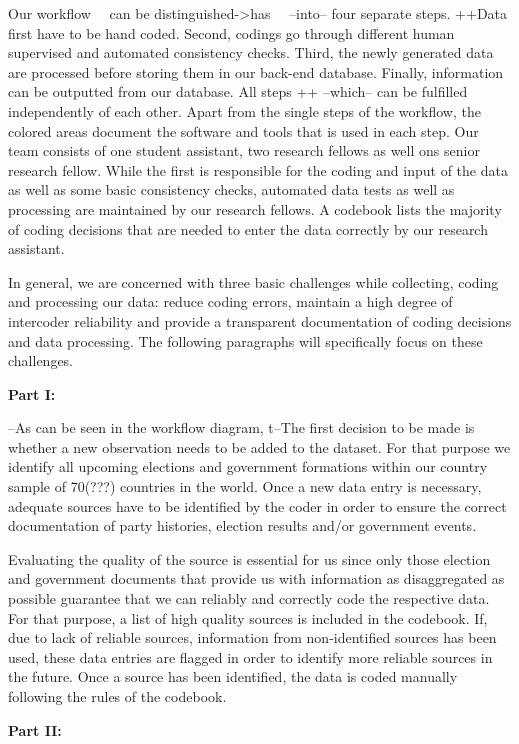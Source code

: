 \documentclass[
  11pt
]{article}
\begin{document}
\noindent Our workflow {~~can be distinguished->has~~} {--into--} four separate steps. {++Data first have to be hand coded. Second, codings go through different human supervised and automated consistency checks. Third, the newly generated data are processed before storing them in our back-end database. Finally, information can be outputted from our database. All steps ++} {--which--} can be
fulfilled independently of each other. Apart from the single steps of the workflow, the colored areas
document the software and tools that is used in each step. Our team
consists of one student assistant, two research fellows as well ons
senior research fellow. While the first is responsible for the coding
and input of the data as well as some basic consistency checks,
automated data tests as well as processing are maintained by our
research fellows. A codebook lists the majority of coding decisions
that are needed to enter the data correctly by our research assistant.

In general, we are concerned with three basic challenges
while collecting, coding and processing our data: reduce
coding errors, maintain a high degree of intercoder
reliability and provide a transparent documentation of
coding decisions and data processing. The following
paragraphs will specifically focus on these challenges.

\textbf{Part I:}

{--As can be seen in the workflow diagram, t--}The first decision to be made is whether a new observation needs to be added to the dataset. For that purpose we identify all upcoming elections and government formations within our country sample of 70(???) countries in the world. Once a new data entry is necessary, adequate sources have to be identified by the coder in order to ensure the correct documentation of party histories, election results and/or government events.

Evaluating the quality of the source is essential for us since only those election and government documents that provide us with information as disaggregated as possible guarantee that we can reliably and correctly code the respective data. For that purpose, a list of high quality sources is included in the codebook. If, due to lack of reliable sources, information from non-identified sources has been used, these data entries are flagged in order to identify more reliable sources in the future. Once a source has been identified, the data is coded manually following the rules of the codebook.

\textbf{Part II:}
\end{document}
